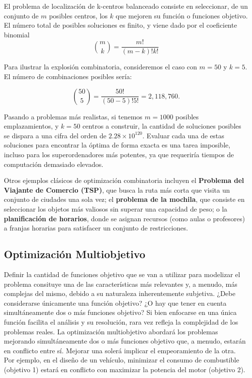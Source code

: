 \documentclass[12pt,a4paper]{book}
\begin{document}
El problema de localización de k-centros balanceado consiste en seleccionar, de un conjunto de $m$ posibles centros, los $k$ que mejoren su función o funciones objetivo. El número total de posibles soluciones es finito, y viene dado por el coeficiente binomial 
$$ \binom{m}{k} = \frac{m!}{(m-k)!k!}$$

Para ilustrar la explosión combinatoria, consideremos el caso con $m=50$ y $k=5$. El número de combinaciones posibles sería:

$$
    \binom{50}{5} = \frac{50!}{(50-5)!5!} = 2,118,760.
$$

Pasando a problemas más realistas, si tenemos $m=1000$ posibles emplazamientos, y $k=50$ centros a construir, la cantidad de soluciones posibles se dispara a una cifra del orden de $2.28 \times 10^{120}$. 
Evaluar cada una de estas soluciones para encontrar la óptima de forma exacta es una tarea imposible, incluso para los superordenadores más potentes, ya que requeriría tiempos de computación demasiado elevados.

Otros ejemplos clásicos de optimización combinatoria incluyen el \textbf{Problema del Viajante de Comercio (TSP)}, 
que busca la ruta más corta que visita un conjunto de ciudades una sola vez;
el \textbf{problema de la mochila}, que consiste en seleccionar los objetos más valiosos sin superar una capacidad de peso;
o la \textbf{planificación de horarios}, donde se asignan recursos (como aulas o profesores) a franjas horarias para satisfacer un conjunto de restricciones.

\subsection{Optimización Multiobjetivo}

Definir la cantidad de funciones objetivo que se van a utilizar para modelizar el problema consituye una de las características más relevantes y, a menudo, más complejas del mismo, debido a su naturaleza inherentemente subjetiva.
¿Debe considerarse únicamente una función objetivo? ¿O hay que tener en cuenta simultáneamente 
dos o más funciones objetivo? Si bien enfocarse en una única función facilita el análisis y su resolución, rara vez refleja la complejidad de los problemas reales. La optimización multiobjetivo
abordará los problemas mejorando simultáneamente dos o más funciones objetivo que, a menudo, estarán en conflicto entre sí. Mejorar una solerá implicar el empeoramiento de la otra.
Por ejemplo, en el diseño de un vehículo, minimizar el consumo de combustible (objetivo 1) estará en conflicto con maximizar la potencia del motor (objetivo 2).
\end{document}
